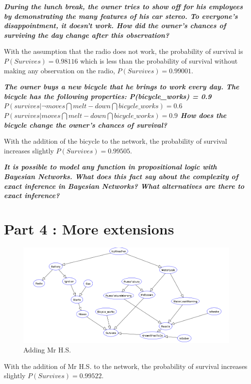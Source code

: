 \textit{\textbf{During the lunch break, the owner tries to show off for his
employees by demonstrating the many features of his car stereo.
To everyone's disappointment, it doesn't work. How did the owner's
chances of surviving the day change after this observation?}}

With the assumption that the radio does not work, the probability of survival
is \textbf{$P(Survives)=0.98116$} which is less than the probability of survival without making any
observation on the radio, \textbf{$P(Survives)=0.99001$}.

\textit{\textbf{The owner buys a new bicycle that he brings to work every day.
The bicycle has the following properties:
P(bicycle\_works) = 0.9
$P(survives | ¬moves \bigcap melt-down \bigcap bicycle\_works) = 0.6$
$P(survives | moves \bigcap melt-down \bigcap bicycle\_works) = 0.9$
How does the bicycle change the owner's chances of survival?}}

With the addition of the bicycle to the network, the probability of survival
increases slightly $P(Survives)=0.99505$.

\textit{\textbf{It is possible to model any function in propositional
logic with Bayesian Networks. What does this fact say about the complexity
of exact inference in Bayesian Networks? What alternatives are there
to exact inference?}}



\newpage
\thispagestyle{empty}
\section*{Part 4 : More extensions}

\begin{figure}[h]
    \centering
      \includegraphics[width=0.83\linewidth]{./images/lab3.png}
    \caption{Adding Mr H.S.\label{graph}}
\end{figure}

With the addition of Mr H.S. to the network, the probability of survival
increases slightly $P(Survives)=0.99522$.

